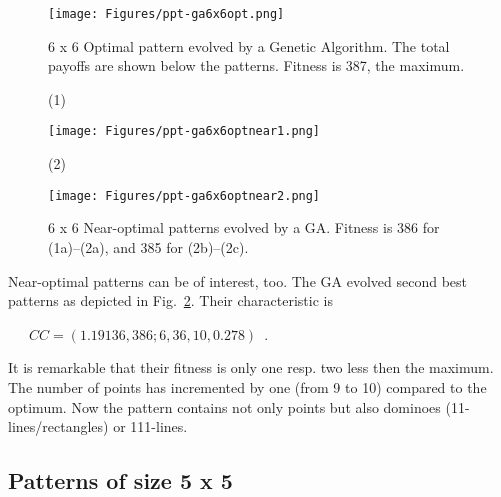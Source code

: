 \documentclass[10pt,a4paper]{article}  %
\begin{document}
\begin{figure}[H] 
\centering

\texttt{[image: Figures/ppt-ga6x6opt.png]}
\caption{
6 x 6 Optimal pattern evolved by a Genetic Algorithm.
The total payoffs are shown below the patterns. 
Fitness is 387, the maximum.
}
\label{ga6x6}
\end{figure}

\begin{figure}[H] 
\centering
(1)

\texttt{[image: Figures/ppt-ga6x6optnear1.png]}

(2)

\texttt{[image: Figures/ppt-ga6x6optnear2.png]}
 		 	
\caption{
6 x 6 Near-optimal patterns evolved by a GA.
Fitness is 386 for (1a)--(2a), and 385 for (2b)--(2c).
}
\label{ga6x6nonopt}
\end{figure}
  
  
  
Near-optimal patterns can be of interest, too.
The GA evolved  second best patterns as depicted in Fig.~\ref{ga6x6nonopt}.
Their characteristic is

~~~$CC=(1.19136, 386; 6, 36, 10, 0.278)$~.

It is remarkable that their fitness 
is only one resp. two  less then the maximum.
The number of points has incremented by one (from 9 to 10) compared to the optimum. 
Now the pattern contains not only  points but also dominoes (11-lines/rectangles) or 111-lines.


\subsection{Patterns of size 5 x 5}
\end{document}
